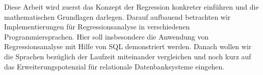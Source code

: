 Diese Arbeit wird zuerst das Konzept der Regression konkreter einführen und die mathematischen Grundlagen darlegen. Darauf aufbauend betrachten wir Implementierungen für Regressionsanalyse in verschiedenen Programmiersprachen. Hier soll insbesondere die Anwendung von Regressionsanalyse mit Hilfe von SQL demonstriert werden. Danach wollen wir die Sprachen bezüglich der Laufzeit miteinander vergleichen und noch kurz auf das Erweiterungspotenzial für relationale Datenbanksysteme eingehen.
